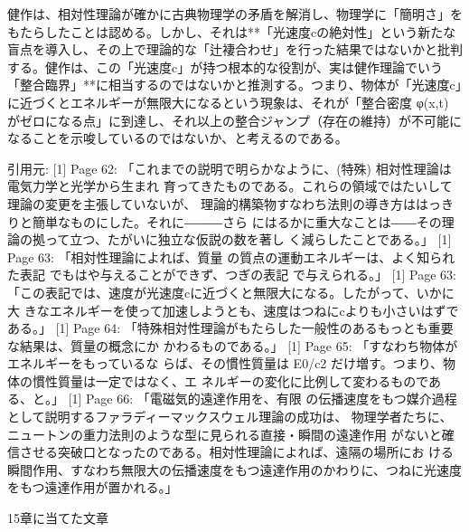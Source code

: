 \documentclass{article}
\begin{document}
健作は、相対性理論が確かに古典物理学の矛盾を解消し、物理学に「簡明さ」をもたらしたことは認める。しかし、それは**「光速度cの絶対性」という新たな盲点を導入し、その上で理論的な「辻褄合わせ」を行った結果ではないかと批判する。健作は、この「光速度c」が持つ根本的な役割が、実は健作理論でいう「整合臨界」**に相当するのではないかと推測する。つまり、物体が「光速度c」に近づくとエネルギーが無限大になるという現象は、それが「整合密度 φ(x,t) がゼロになる点」に到達し、それ以上の整合ジャンプ（存在の維持）が不可能になることを示唆しているのではないか、と考えるのである。

引用元:
[1] Page 62: 「これまでの説明で明らかなように、(特殊) 相対性理論は電気力学と光学から生まれ 育ってきたものである。これらの領域ではたいして理論の変更を主張していないが、 理論的構築物すなわち法則の導き方ははっきりと簡単なものにした。それに―――さら にはるかに重大なことは――その理論の拠って立つ、たがいに独立な仮説の数を著し く減らしたことである。」
[1] Page 63: 「相対性理論によれば、質量 の質点の運動エネルギーは、よく知られた表記 でもはや与えることができず、つぎの表記 で与えられる。」
[1] Page 63: 「この表記では、速度が光速度cに近づくと無限大になる。したがって、いかに大 きなエネルギーを使って加速しようとも、速度はつねにcよりも小さいはずである。」
[1] Page 64: 「特殊相対性理論がもたらした一般性のあるもっとも重要な結果は、質量の概念にか かわるものである。」
[1] Page 65: 「すなわち物体がエネルギーをもっているな らば、その慣性質量は E0​/c2 だけ増す。つまり、物体の慣性質量は一定ではなく、エ ネルギーの変化に比例して変わるものである、と。」
[1] Page 66: 「電磁気的遠達作用を、有限 の伝播速度をもつ媒介過程として説明するファラディーマックスウェル理論の成功は、 物理学者たちに、ニュートンの重力法則のような型に見られる直接・瞬間の遠達作用 がないと確信させる突破口となったのである。相対性理論によれば、遠隔の場所にお ける瞬間作用、すなわち無限大の伝播速度をもつ遠達作用のかわりに、つねに光速度 をもつ遠達作用が置かれる。」


15章に当てた文章
\end{document}
